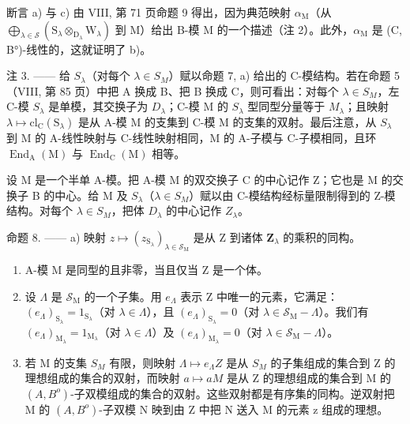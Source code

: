 断言 a) 与 c) 由 VIII, 第 71 页命题 9 得出，因为典范映射 \(\alpha_{\mathrm{M}}\)（从 \(\bigoplus_{\lambda \in \mathcal{S}} (\mathrm{S}_{\lambda} \otimes_{\mathrm{D}_{\lambda}} \mathrm{W}_{\lambda})\) 到 M）给出 B-模 M 的一个描述（注 2）。此外，\(\alpha_{\mathrm{M}}\) 是 (C, B°)-线性的，这就证明了 b)。

注 3. —— 给 \(S_{\lambda}\)（对每个 \(\lambda \in S_{M}\)）赋以命题 7, a) 给出的 C-模结构。若在命题 5（VIII, 第 85 页）中把 A 换成 B、把 B 换成 C，则可看出：对每个 \(\lambda \in S_{M}\)，左 C-模 \(S_{\lambda}\) 是单模，其交换子为 \(D_{\lambda}\)；C-模 M 的 \(S_{\lambda}\) 型同型分量等于 \(M_{\lambda}\)；且映射 \(\lambda \mapsto \mathrm{cl}_{\mathrm{C}}(\mathrm{S}_{\lambda})\) 是从 A-模 M 的支集到 C-模 M 的支集的双射。最后注意，从 \(S_{\lambda}\) 到 M 的 A-线性映射与 C-线性映射相同，M 的 A-子模与 C-子模相同，且环 \(\operatorname{End}_{\mathrm{A}}(\mathrm{M})\) 与 \(\operatorname{End}_{\mathrm{C}}(\mathrm{M})\) 相等。

设 M 是一个半单 A-模。把 A-模 M 的双交换子 C 的中心记作 Z；它也是 M 的交换子 B 的中心。给 M 及 \(S_{\lambda}\)（\(\lambda \in S_{M}\)）赋以由 C-模结构经标量限制得到的 Z-模结构。对每个 \(\lambda \in S_{M}\)，把体 \(D_{\lambda}\) 的中心记作 \(Z_{\lambda}\)。

命题 8. —— a) 映射 \(z \mapsto (z_{\mathrm{S}_{\lambda}})_{\lambda \in \mathcal{S}_{\mathrm{M}}}\) 是从 Z 到诸体 \(\mathbf{Z}_{\lambda}\) 的乘积的同构。

\begin{enumerate}
\def\labelenumi{\alph{enumi})}
\setcounter{enumi}{1}
\item
  A-模 M 是同型的且非零，当且仅当 Z 是一个体。
\item
  设 \(\Lambda\) 是 \(\mathcal{S}_{\mathrm{M}}\) 的一个子集。用 \(e_{\Lambda}\) 表示 \(\mathrm{Z}\) 中唯一的元素，它满足：\((e_{\Lambda})_{\mathrm{S}_{\lambda}} = 1_{\mathrm{S}_{\lambda}}\)（对 \(\lambda \in \Lambda\)），且 \((e_{\Lambda})_{\mathrm{S}_{\lambda}} = 0\)（对 \(\lambda \in \mathcal{S}_{\mathrm{M}} - \Lambda\)）。我们有 \((e_{\Lambda})_{\mathrm{M}_{\lambda}} = 1_{\mathrm{M}_{\lambda}}\)（对 \(\lambda \in \Lambda\)）及 \((e_{\Lambda})_{\mathrm{M}_{\lambda}} = 0\)（对 \(\lambda \in \mathcal{S}_{\mathrm{M}} - \Lambda\)）。
\item
  若 M 的支集 \(S_{M}\) 有限，则映射 \(\Lambda \mapsto e_{\Lambda}Z\) 是从 \(S_{M}\) 的子集组成的集合到 Z 的理想组成的集合的双射，而映射 \(a \mapsto aM\) 是从 Z 的理想组成的集合到 M 的 \((A,B^{o})\)-子双模组成的集合的双射。这些双射都是有序集的同构。逆双射把 M 的 \((A,B^{o})\)-子双模 N 映到由 Z 中把 N 送入 M 的元素 z 组成的理想。
\end{enumerate}

